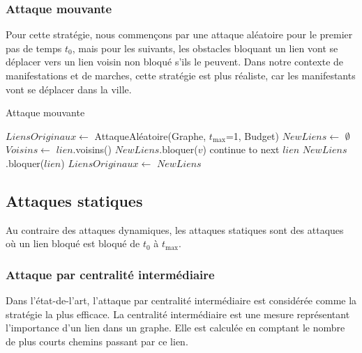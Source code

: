 \subsubsection{Attaque mouvante}\label{subsubsec:attaque_mouvante}

Pour cette stratégie, nous commençons par une attaque aléatoire pour le premier pas de temps ${t_{0}}$, mais pour les suivants, les obstacles bloquant un lien vont se déplacer vers un lien voisin non bloqué s'ils le peuvent.
Dans notre contexte de manifestations et de marches, cette stratégie est plus réaliste, car les manifestants vont se déplacer dans la ville.
\begin{algorithm}[H]
\caption{Attaque mouvante}
\begin{algorithmic}
\State $LiensOriginaux \gets$ AttaqueAléatoire(Graphe, ${t_{\max}}$=1, Budget)
    \State $NewLiens \gets$ $\emptyset$
        \State $Voisins \gets$ $lien$.voisins()
                \State $NewLiens$.bloquer($v$)
                \State continue to next $lien$
            \EndIf
        \EndFor
        \State $NewLiens$.bloquer($lien$)
    \EndFor
    \State $LiensOriginaux \gets$ $NewLiens$
\EndFor
\end{algorithmic}
\end{algorithm}
\subsection{Attaques statiques}\label{subsec:attaques_statiques}

Au contraire des attaques dynamiques, les attaques statiques sont des attaques où un lien bloqué est bloqué de ${t_{0}}$ à ${t_{\max}}$.

\subsubsection{Attaque par centralité intermédiaire}\label{subsubsec:attaque_centralite_intermediaire}

Dans l'état-de-l'art, l'attaque par centralité intermédiaire est considérée comme la stratégie la plus efficace.
La centralité intermédiaire est une mesure représentant l'importance d'un lien dans un graphe.
Elle est calculée en comptant le nombre de plus courts chemins passant par ce lien.

